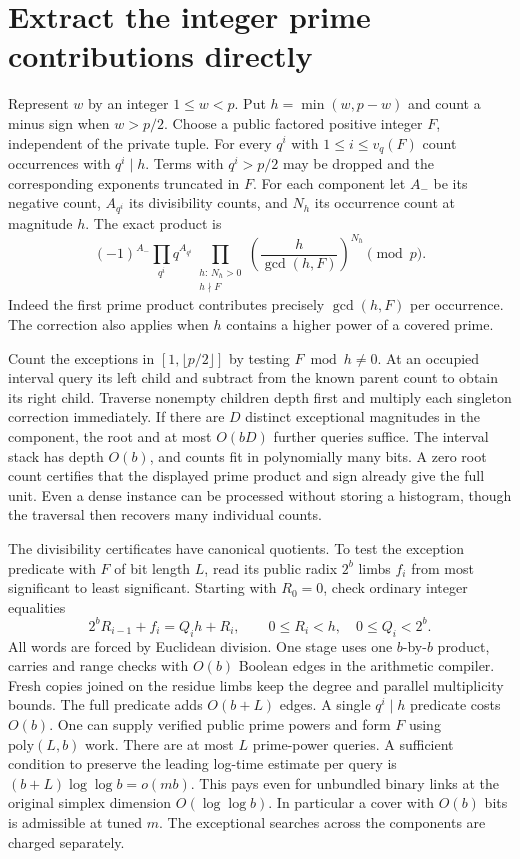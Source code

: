 \documentclass[11pt]{article}
\begin{document}
\section{Extract the integer prime contributions directly}
Represent $w$ by an integer $1\le w<p$. Put $h=\min(w,p-w)$ and count a
minus sign when $w>p/2$. Choose a public factored positive integer $F$,
independent of the private tuple. For every $q^i$ with $1\le i\le v_q(F)$
count occurrences with $q^i\mid h$. Terms with $q^i>p/2$ may be dropped
and the corresponding exponents truncated in $F$. For each component let
$A_-$ be its negative count, $A_{q^i}$ its divisibility counts, and $N_h$
its occurrence count at magnitude $h$. The exact product is
\[
 (-1)^{A_-}\prod_{q^i}q^{A_{q^i}}
 \prod_{\substack{h:\,N_h>0\\ h\nmid F}}
       \left(\frac{h}{\gcd(h,F)}\right)^{N_h}\pmod p .
\]
Indeed the first prime product contributes precisely $\gcd(h,F)$ per
occurrence. The correction also applies when $h$ contains a higher
power of a covered prime.

Count the exceptions in $[1,\lfloor p/2\rfloor]$ by testing $F\bmod h\ne0$.
At an occupied interval query its left child and subtract from the known
parent count to obtain its right child. Traverse nonempty children depth
first and multiply each singleton correction immediately. If there are
$D$ distinct exceptional magnitudes in the component, the root and
at most $O(bD)$ further queries suffice. The interval stack has depth
$O(b)$, and counts fit in polynomially many bits. A zero root count
certifies that the displayed prime product and sign already give the
full unit. Even a dense instance can be processed without storing a
histogram, though the traversal then recovers many individual counts.

The divisibility certificates have canonical quotients. To test the
exception predicate with $F$ of bit length $L$, read its public radix
$2^b$ limbs $f_i$ from most significant to least significant. Starting
with $R_0=0$, check ordinary integer equalities
\[
 2^bR_{i-1}+f_i=Q_i h+R_i,\qquad 0\le R_i<h,\quad 0\le Q_i<2^b .
\]
All words are forced by Euclidean division. One stage uses one
$b$-by-$b$ product, carries and range checks with $O(b)$ Boolean edges
in the arithmetic compiler. Fresh copies joined on the residue limbs
keep the degree and parallel multiplicity bounds. The full predicate
adds $O(b+L)$ edges. A single $q^i\mid h$ predicate costs $O(b)$.
One can supply verified public prime powers and form $F$ using
$\mathrm{poly}(L,b)$ work. There are at most $L$ prime-power queries.
A sufficient condition to preserve the leading log-time estimate
per query is $(b+L)\log\log b=o(mb)$. This pays even for unbundled
binary links at the original simplex dimension $O(\log\log b)$.
In particular a cover with $O(b)$ bits is admissible at tuned $m$.
The exceptional searches across the components are charged separately.
\end{document}
